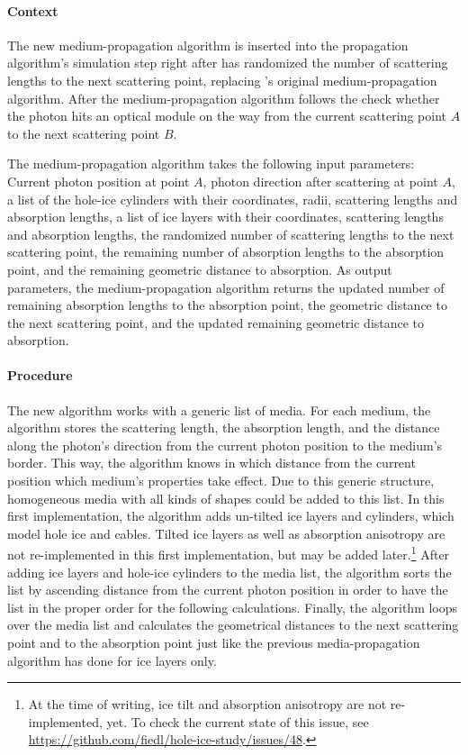 \paragraph{Context}
The new medium-propagation algorithm is inserted into the \clsim propagation algorithm's simulation step right after \clsim has randomized the number of scattering lengths to the next scattering point, replacing \clsim's original medium-propagation algorithm. After the medium-propagation algorithm follows the check whether the photon hits an optical module on the way from the current scattering point $A$ to the next scattering point $B$.

The medium-propagation algorithm takes the following input parameters: Current photon position at point $A$, photon direction after scattering at point $A$, a list of the hole-ice cylinders with their coordinates, radii, scattering lengths and absorption lengths, a list of ice layers with their coordinates, scattering lengths and absorption lengths, the randomized number of scattering lengths to the next scattering point, the remaining number of absorption lengths to the absorption point, and the remaining geometric distance to absorption.
As output parameters, the medium-propagation algorithm returns the updated number of remaining absorption lengths to the absorption point, the geometric distance to the next scattering point, and the updated remaining geometric distance to absorption.

\paragraph{Procedure}
The new algorithm works with a generic list of media. For each medium, the algorithm stores the scattering length, the absorption length, and the distance along the photon's direction from the current photon position to the medium's border. This way, the algorithm knows in which distance from the current position which medium's properties take effect.
Due to this generic structure, homogeneous media with all kinds of shapes could be added to this list. In this first implementation, the algorithm adds un-tilted ice layers and cylinders, which model hole ice and cables. Tilted ice layers as well as absorption anisotropy are not re-implemented in this first implementation, but may be added later.\footnote{At the time of writing, ice tilt and absorption anisotropy are not re-implemented, yet. To check the current state of this issue, see \url{https://github.com/fiedl/hole-ice-study/issues/48}.}
After adding ice layers and hole-ice cylinders to the media list, the algorithm sorts the list by ascending distance from the current photon position in order to have the list in the proper order for the following calculations.
Finally, the algorithm loops over the media list and calculates the geometrical distances to the next scattering point and to the absorption point just like the previous media-propagation algorithm has done for ice layers only.

